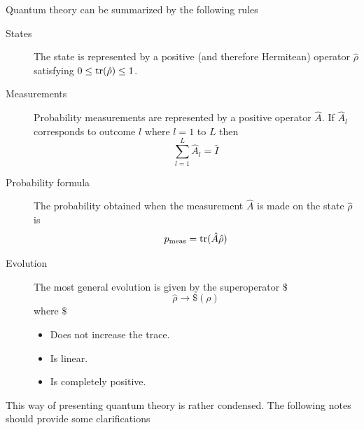 \documentclass[10pt,twocolumn]{article}
\begin{document}
Quantum theory can be summarized by the following rules
\begin{description}
\item[States] The state is represented by a positive (and therefore Hermitean)
operator $\hat{\rho}$ satisfying $0\leq {\rm tr}(\hat{\rho})\leq 1$.
\item[Measurements] Probability measurements are represented by a
positive operator $\hat{A}$.  If $\hat{A}_l$ corresponds to outcome $l$
where $l=1$ to $L$ then
\begin{equation}
\sum_{l=1}^L \hat{A}_l = \hat{I}
\end{equation}
\item[Probability formula] The probability obtained when the measurement
$\hat{A}$ is made on the state $\hat{\rho}$ is
\begin{equation}\label{traceeqn}
p_{\rm meas}={\rm tr}(\hat{A}\hat{\rho})
\end{equation}
\item[Evolution] The most general evolution is given by the
superoperator $\$ $
\begin{equation}
\hat{\rho}\rightarrow \$ (\rho)
\end{equation}
where $\$ $
\begin{itemize}
\item Does not increase the trace.
\item Is linear.
\item Is completely positive.
\end{itemize}
\end{description}
This way of presenting quantum theory is rather condensed.  The
following notes should provide some clarifications
\end{document}
